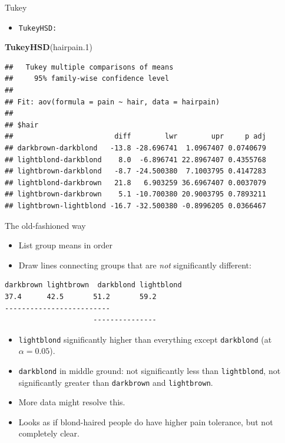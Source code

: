 \documentclass[
  ignorenonframetext,
]{beamer}
\newenvironment{Shaded}{\begin{snugshade}}{\end{snugshade}}
\newcommand{\FloatTok}[1]{\textcolor[rgb]{0.00,0.00,0.81}{#1}}
\newcommand{\KeywordTok}[1]{\textcolor[rgb]{0.13,0.29,0.53}{\textbf{#1}}}
\newcommand{\NormalTok}[1]{#1}
\providecommand{\tightlist}{%
  \setlength{\itemsep}{0pt}\setlength{\parskip}{0pt}}
\begin{document}
\begin{frame}[fragile]{Tukey}
\protect\hypertarget{tukey}{}

\begin{itemize}
\tightlist
\item
  \texttt{TukeyHSD:}
\end{itemize}

\footnotesize

\begin{Shaded}
\begin{Highlighting}[]
\KeywordTok{TukeyHSD}\NormalTok{(hairpain}\FloatTok{.1}\NormalTok{)}
\end{Highlighting}
\end{Shaded}

\begin{verbatim}
##   Tukey multiple comparisons of means
##     95% family-wise confidence level
## 
## Fit: aov(formula = pain ~ hair, data = hairpain)
## 
## $hair
##                        diff        lwr        upr     p adj
## darkbrown-darkblond   -13.8 -28.696741  1.0967407 0.0740679
## lightblond-darkblond    8.0  -6.896741 22.8967407 0.4355768
## lightbrown-darkblond   -8.7 -24.500380  7.1003795 0.4147283
## lightblond-darkbrown   21.8   6.903259 36.6967407 0.0037079
## lightbrown-darkbrown    5.1 -10.700380 20.9003795 0.7893211
## lightbrown-lightblond -16.7 -32.500380 -0.8996205 0.0366467
\end{verbatim}

\normalsize

\end{frame}

\begin{frame}[fragile]{The old-fashioned way}
\protect\hypertarget{the-old-fashioned-way}{}

\begin{itemize}
\item
  List group means in order
\item
  Draw lines connecting groups that are \emph{not} significantly
  different:
\end{itemize}

\begin{verbatim}
darkbrown lightbrown  darkblond lightblond
37.4      42.5       51.2       59.2
-------------------------
                     ---------------
\end{verbatim}

\begin{itemize}
\item
  \texttt{lightblond} significantly higher than everything except
  \texttt{darkblond} (at \(\alpha=0.05\)).
\item
  \texttt{darkblond} in middle ground: not significantly less than
  \texttt{lightblond}, not significantly greater than \texttt{darkbrown}
  and \texttt{lightbrown}.
\item
  More data might resolve this.
\item
  Looks as if blond-haired people do have higher pain tolerance, but not
  completely clear.
\end{itemize}

\end{frame}
\end{document}

